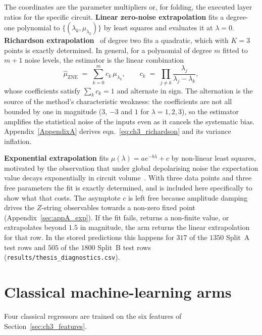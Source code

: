 \documentclass[Thesis.tex]{subfiles}
\begin{document}
The coordinates are the parameter multipliers or, for folding, the executed
layer ratios for the specific circuit. \textbf{Linear zero-noise extrapolation}
fits a degree-one polynomial to
$\{(\lambda_k, \mu_{\lambda_k})\}$ by least squares and evaluates it at
$\lambda = 0$. \textbf{Richardson extrapolation}~\cite{temme2017error} of degree
two fits a quadratic,
which with $K = 3$ points is exactly determined. In general, for a polynomial of
degree $m$ fitted to $m+1$ noise levels, the estimator is the linear combination
\begin{equation}
    \widehat{\mu}_{\text{ZNE}} \;=\; \sum_{k=0}^{m} c_k\, \mu_{\lambda_k},
    \qquad
    c_k \;=\; \prod_{j \neq k} \frac{\lambda_j}{\lambda_j - \lambda_k},
    \label{eq:ch3_richardson}
\end{equation}
whose coefficients satisfy $\sum_k c_k = 1$ and alternate in sign. The alternation
is the source of the method's characteristic weakness: the coefficients are not all bounded by one in magnitude ($3$, $-3$ and $1$ for $\lambda = 1, 2, 3$), so the estimator amplifies the statistical noise of the
inputs even as it cancels the systematic bias. Appendix~\ref{AppendixA} derives
eqn.~\eqref{eq:ch3_richardson} and its variance inflation.

\textbf{Exponential extrapolation} fits $\mu(\lambda) = a e^{-b\lambda} + c$ by
non-linear least squares, motivated by the observation that under global
depolarising noise the expectation value decays exponentially in circuit
volume~\cite{endo2018practical,cai2021multiexponential}. With
three data points and three free parameters the fit is exactly determined, and is
included here specifically to show what that costs. The asymptote $c$ is left free
because amplitude damping drives the $Z$-string observables towards a non-zero fixed
point (Appendix~\ref{sec:appA_exp}). If the fit fails, returns a non-finite value, or
extrapolates beyond $1.5$ in magnitude, the arm returns the linear extrapolation for
that row. In the stored predictions this happens for $317$ of the $1350$ Split~A test
rows and $505$ of the $1800$ Split~B test rows
(\texttt{results/thesis\_diagnostics.csv}).

\section{Classical machine-learning arms}\label{sec:ch3_classical}

Four classical regressors are trained on the six features of
Section~\ref{sec:ch3_features}.
\end{document}
